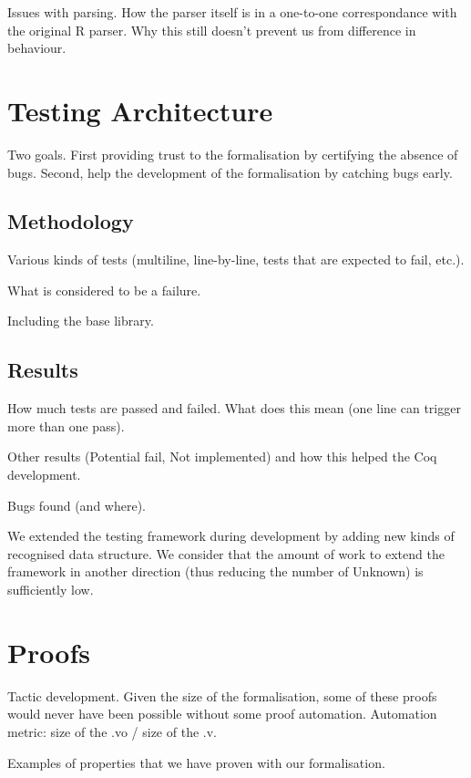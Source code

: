 \documentclass[10pt, acmart]{article}
\begin{document}
Issues with parsing.
How the parser itself is in a one-to-one correspondance with the original R parser.
Why this still doesn’t prevent us from difference in behaviour.

\section{Testing Architecture}
\label{sec:testing:architecture}

Two goals.
First providing trust to the formalisation by certifying the absence of bugs.
Second, help the development of the formalisation by catching bugs early.

\subsection{Methodology}
\label{sec:test:methodology}

Various kinds of tests (multiline, line-by-line, tests that are expected to fail, etc.).

What is considered to be a failure.

Including the base library.

\subsection{Results}
\label{sec:test:results}

How much tests are passed and failed.
What does this mean (one line can trigger more than one pass).

Other results (Potential fail, Not implemented) and how this helped the Coq development.

Bugs found (and where).

We extended the testing framework during development by adding new kinds of recognised
data structure.
We consider that the amount of work to extend the framework in another direction
(thus reducing the number of Unknown) is sufficiently low.

\section{Proofs}
\label{sec:proofs}

Tactic development.
Given the size of the formalisation, some of these proofs would never have been possible
without some proof automation.
Automation metric: size of the .vo / size of the .v.

Examples of properties that we have proven with our formalisation.
\end{document}
